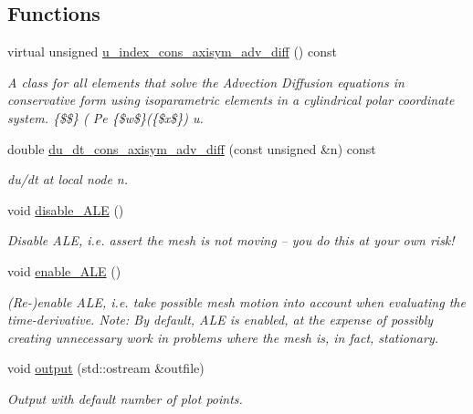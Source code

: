 \subsection*{Functions}
\begin{DoxyCompactItemize}
\item 
virtual unsigned \hyperlink{namespaceoomph_a03ba213638004c56b6417e159f16892f}{u\+\_\+index\+\_\+cons\+\_\+axisym\+\_\+adv\+\_\+diff} () const
\begin{DoxyCompactList}\small\item\em A class for all elements that solve the Advection Diffusion equations in conservative form using isoparametric elements in a cylindrical polar coordinate system. \{\$\$\} ( Pe \{\$w\$\}(\{\$x\$\}) u. \end{DoxyCompactList}\item 
double \hyperlink{namespaceoomph_aae18c2f8b384a4a115d68ee5cbcdc84a}{du\+\_\+dt\+\_\+cons\+\_\+axisym\+\_\+adv\+\_\+diff} (const unsigned \&n) const
\begin{DoxyCompactList}\small\item\em du/dt at local node n. \end{DoxyCompactList}\item 
void \hyperlink{namespaceoomph_aac9e9b485dd3b82c6c0b42989017c57f}{disable\+\_\+\+A\+LE} ()
\begin{DoxyCompactList}\small\item\em Disable A\+LE, i.\+e. assert the mesh is not moving -- you do this at your own risk! \end{DoxyCompactList}\item 
void \hyperlink{namespaceoomph_aad37abf393b70f7aa747525923469a08}{enable\+\_\+\+A\+LE} ()
\begin{DoxyCompactList}\small\item\em (Re-\/)enable A\+LE, i.\+e. take possible mesh motion into account when evaluating the time-\/derivative. Note\+: By default, A\+LE is enabled, at the expense of possibly creating unnecessary work in problems where the mesh is, in fact, stationary. \end{DoxyCompactList}\item 
void \hyperlink{namespaceoomph_a2473930e2634d673e2a3bed63b6851f0}{output} (std\+::ostream \&outfile)
\begin{DoxyCompactList}\small\item\em Output with default number of plot points. \end{DoxyCompactList}\item 

\end{DoxyCompactItemize}
